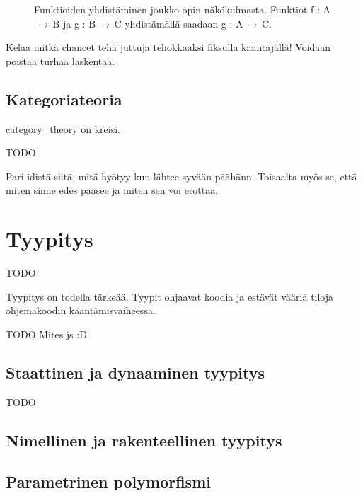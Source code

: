 \begin{figure}[htbp]
	\caption{Funktioiden yhdistäminen joukko-opin näkökulmasta. Funktiot f : A$\,\to\,$B ja g : B$\,\to\,$C yhdistämällä saadaan g : A$\,\to\,$C.}
\end{figure}


Kelaa mitkä chancet tehä juttuja tehokkaaksi fiksulla kääntäjällä! Voidaan poistaa turhaa laskentaa.

\subsection{Kategoriateoria}

\Gls{category_theory} on kreisi.

TODO

Pari idistä siitä, mitä hyötyy kun lähtee syvään päähänn. Toisaalta myös se, että miten sinne edes pääsee ja miten sen voi erottaa.

\section{Tyypitys}

TODO

Tyypitys on todella tärkeää. Tyypit ohjaavat koodia ja estävät vääriä tiloja ohjemakoodin kääntämisvaiheessa.

TODO Mites \gls{js} :D

\subsection{Staattinen ja dynaaminen tyypitys}

TODO

\subsection{Nimellinen ja rakenteellinen tyypitys}


\subsection{Parametrinen polymorfismi}

